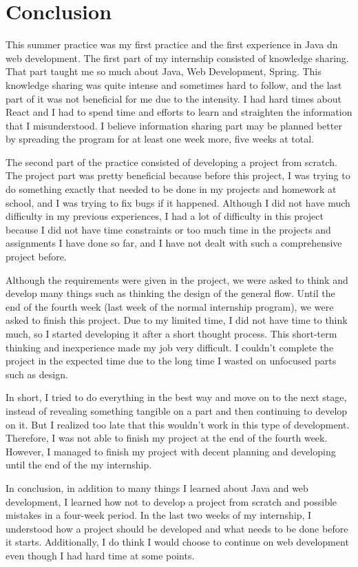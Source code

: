 \section{Conclusion}

This summer practice was my first practice and the first experience in Java dn web development. The first part of my internship consisted of knowledge sharing. That part taught me so much about Java, Web Development, Spring. This knowledge sharing was quite intense and sometimes hard to follow, and the last part of it was not beneficial for me due to the intensity. I had hard times about React and I had to spend time and efforts to learn and straighten the information that I misunderstood. I believe information sharing part may be planned better by spreading the program for at least one week more, five weeks at total.

The second part of the practice consisted of developing a project from scratch. The project part was pretty beneficial because before this project, I was trying to do something exactly that needed to be done in my projects and homework at school, and I was trying to fix bugs if it happened. Although I did not have much difficulty in my previous experiences, I had a lot of difficulty in this project because I did not have time constraints or too much time in the projects and assignments I have done so far, and I have not dealt with such a comprehensive project before.

Although the requirements were given in the project, we were asked to think and develop many things such as thinking the design of the general flow. Until the end of the fourth week (last week of the normal internship program), we were asked to finish this project. Due to my limited time, I did not have time to think much, so I started developing it after a short thought process. This short-term thinking and inexperience made my job very difficult. I couldn't complete the project in the expected time due to the long time I wasted on unfocused parts such as design.

In short, I tried to do everything in the best way and move on to the next stage, instead of revealing something tangible on a part and then continuing to develop on it. But I realized too late that this wouldn't work in this type of development. Therefore, I was not able to finish my project at the end of the fourth week. However, I managed to finish my project with decent planning and developing until the end of the my internship.

In conclusion, in addition to many things I learned about Java and web development, I learned how not to develop a project from scratch and possible mistakes in a four-week period. In the last two weeks of my internship, I understood how a project should be developed and what needs to be done before it starts. Additionally, I do think I would choose to continue on web development even though I had hard time at some points.
